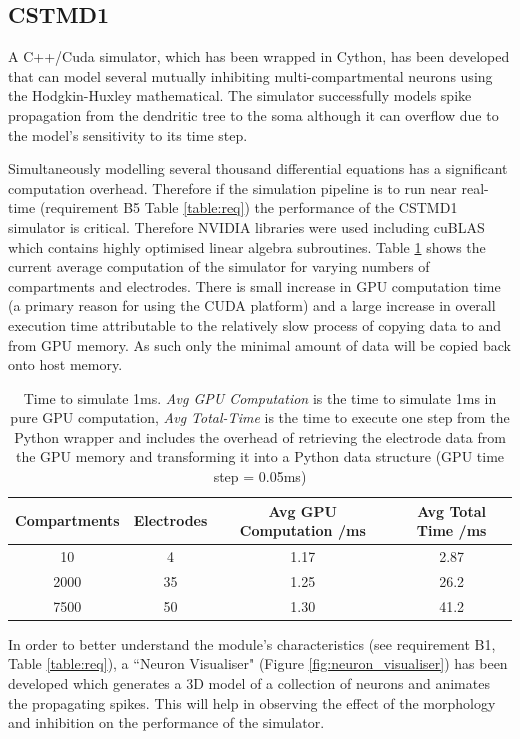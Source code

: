 \subsection{CSTMD1}

A C++/Cuda simulator, which has been wrapped in Cython, has been developed that can model several mutually inhibiting multi-compartmental neurons using the Hodgkin-Huxley mathematical. The simulator successfully models spike propagation from the dendritic tree \cite{CSTMD1} to the soma although it can overflow due to the model's sensitivity to its time step.

Simultaneously modelling several thousand differential equations has a significant computation overhead. Therefore if the simulation pipeline is to run near real-time (requirement B5 Table \ref{table:req}) the performance of the CSTMD1 simulator is critical. Therefore NVIDIA libraries were used including cuBLAS which contains highly optimised linear algebra subroutines. Table \ref{table:cstmd_performance} shows the current average computation of the simulator for varying numbers of compartments and electrodes. There is  small increase in GPU computation time (a primary reason for using the CUDA platform) and a large increase in overall execution time attributable to the relatively slow process of copying data to and from GPU memory. As such only the minimal amount of data will be copied back onto host memory.

\begin{table}[!ht]
    \centering
    \begin{tabular}{c|c|c|c}
    Compartments & Electrodes &  Avg GPU Computation /ms  & Avg Total Time /ms  \\\hline
    10 & 4 & 1.17 & 2.87     \\
    2000 & 35 & 1.25 & 26.2  \\
    7500 &50 & 1.30 & 41.2  \\
    \end{tabular}
    \caption{Time to simulate 1ms. \textit{Avg GPU Computation} is the time to simulate 1ms in pure GPU computation, \textit{ Avg Total-Time} is the time to execute one step from the Python wrapper and includes the overhead of retrieving the electrode data from the GPU memory and transforming it into a Python data structure (GPU time step = 0.05ms)}
    \label{table:cstmd_performance}
\end{table}

In order to better understand the module's characteristics (see requirement B1, Table \ref{table:req}), a ``Neuron Visualiser" (Figure \ref{fig:neuron_visualiser}) has been developed which generates a 3D model of a collection of neurons and animates the propagating spikes. This will help in observing the effect of the morphology and inhibition on the performance of the simulator.

